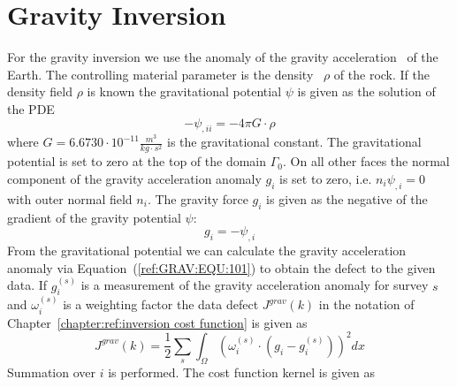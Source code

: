
%
%
%

\section{Gravity Inversion}\label{sec:forward gravity}
For the gravity inversion we use the anomaly of the gravity acceleration~ of the Earth.
The controlling material parameter is the density~ $\rho$ of
the rock.
If the density field $\rho$ is known the gravitational potential $\psi$ is
given as the solution of the PDE
\begin{equation}\label{ref:GRAV:EQU:100}
-\psi_{,ii} = -4\pi G \cdot  \rho
\end{equation}
where $G=6.6730 \cdot 10^{-11}  \frac{m^3}{kg \cdot s^2}$ is the gravitational
constant.
The gravitational potential is set to zero at the top of the
domain $\Gamma_0$.
On all other faces the normal component of the gravity acceleration anomaly
$g_i$ is set to zero, i.e. $n_i \psi_{,i} = 0$ with outer normal field $n_i$.
The gravity force $g_i$ is given as the negative of the gradient of the gravity
potential $\psi$:
\begin{equation}\label{ref:GRAV:EQU:101}
 g_i = - \psi_{,i} 
\end{equation} 
From the gravitational potential we can calculate the gravity acceleration
anomaly via Equation~(\ref{ref:GRAV:EQU:101}) to obtain the defect to the
given data.
If $g^{(s)}_i$ is a measurement of the gravity acceleration anomaly for
survey $s$ and $\omega^{(s)}_i$ is a weighting factor the data defect
$J^{grav}(k)$ in the notation of Chapter~\ref{chapter:ref:inversion cost function} is given as
\begin{equation}\label{ref:GRAV:EQU:9}
J^{grav}(k) = \frac{1}{2}\sum_{s} \int_{\Omega} ( \omega^{(s)}_i \cdot (g_{i}- g^{(s)}_i) ) ^2 dx
\end{equation} 
Summation over $i$ is performed. 
The cost function kernel is given as
